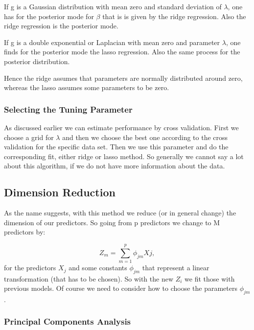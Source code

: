\documentclass{article}
\begin{document}
If g is a Gaussian distribution with mean zero and standard deviation of $\lambda$, one has for the posterior mode for $\beta$ that is is given by the ridge regression. Also the ridge regression is the posterior mode.

If g is a double exponential or Laplacian with mean zero and parameter $\lambda$, one finds for the posterior mode the lasso regression. Also the same process for the posterior distribution.

Hence the ridge assumes that parameters are normally distributed around zero, whereas the lasso assumes some parameters to be zero.

\subsubsection{Selecting the Tuning Parameter}
 As discussed earlier we can estimate performance by cross validation. First we choose a grid for $\lambda$ and then we choose the best one according to the cross validation for the specific data set. Then we use this parameter and do the corresponding fit, either ridge or lasso method. So generally we cannot say a lot about this algorithm, if we do not have more information about the data.
 
 
 \subsection{Dimension Reduction}
 As the name suggests, with this method we reduce (or in general change) the dimension of our predictors. So going from p predictors we change to M predictors by:
 
 \begin{equation}
     Z_m = \sum_{m=1}^p \phi_{jm}Xj,
 \end{equation}
 for the predictors $X_j$ and some constants $\phi_{jm}$ that represent a linear transformation (that has to be chosen). So with the new $Z_i$ we fit those with previous models. Of course we need to consider how to choose the parameters $\phi_{jm}$.
 
 \subsubsection{Principal Components Analysis}
 
\end{document}
